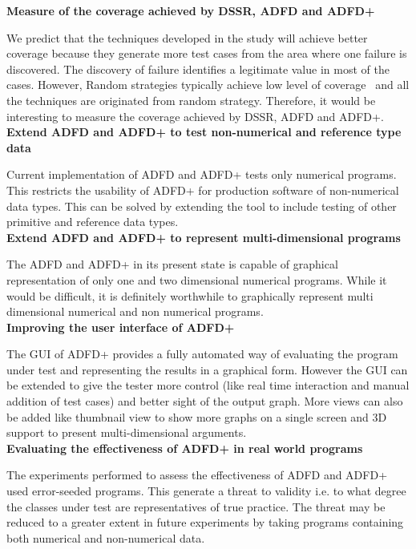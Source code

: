 \textbf{Measure of the coverage achieved by DSSR, ADFD and ADFD+}

We predict that the techniques developed in the study will achieve better coverage because they generate more test cases from the area where one failure is discovered. The discovery of failure identifies a legitimate value in most of the cases. However, Random strategies typically achieve low level of coverage~\cite{oriol2010yeti} and all the techniques are originated from random strategy. Therefore, it would be interesting to measure the coverage achieved by DSSR, ADFD and ADFD+.\\

\textbf{Extend ADFD and ADFD+ to test non-numerical and reference type data}

Current implementation of ADFD and ADFD+ tests only numerical programs. This restricts the usability of ADFD+ for production software of non-numerical data types. This can be solved by extending the tool to include testing of other primitive and reference data types. \\

\textbf{Extend ADFD and ADFD+ to represent multi-dimensional programs}

The ADFD and ADFD+ in its present state is capable of graphical representation of only one and two dimensional numerical programs. While it would be difficult, it is definitely worthwhile to graphically represent multi dimensional numerical and non numerical programs.\\

\textbf{Improving the user interface of ADFD+}

The GUI of ADFD+ provides a fully automated way of evaluating the program under test and representing the results in a graphical form. However the GUI can be extended to give the tester more control (like real time interaction and manual addition of test cases) and better sight of the output graph. More views can also be added like thumbnail view to show more graphs on a single screen and 3D support to present multi-dimensional arguments.\\

\textbf{Evaluating the effectiveness of ADFD+ in real world programs}

The experiments performed to assess the effectiveness of ADFD and ADFD+ used error-seeded programs. This generate a threat to validity i.e. to what degree the classes under test are representatives of true practice. The threat may be reduced to a greater extent in future experiments by taking programs containing both numerical and non-numerical data.  \\

